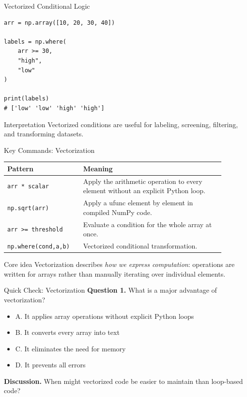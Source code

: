 \documentclass[aspectratio=169,11pt]{beamer}
\newcommand{\quiztitle}[1]{\textbf{\textcolor{QuizOrange}{#1}}}
\begin{document}
\begin{frame}[fragile]{Vectorized Conditional Logic}
\small
\begin{lstlisting}[style=py]
arr = np.array([10, 20, 30, 40])

labels = np.where(
    arr >= 30,
    "high",
    "low"
)

print(labels)
# ['low' 'low' 'high' 'high']
\end{lstlisting}
\begin{block}{Interpretation}
Vectorized conditions are useful for labeling, screening, filtering, and transforming datasets.
\end{block}
\end{frame}

\begin{frame}{Key Commands: Vectorization}
\small
\begin{tabular}{p{0.30\linewidth}p{0.59\linewidth}}
\toprule
\textbf{Pattern} & \textbf{Meaning} \\
\midrule
\texttt{arr * scalar} & Apply the arithmetic operation to every element without an explicit Python loop. \\
\texttt{np.sqrt(arr)} & Apply a ufunc element by element in compiled NumPy code. \\
\texttt{arr >= threshold} & Evaluate a condition for the whole array at once. \\
\texttt{np.where(cond,a,b)} & Vectorized conditional transformation. \\
\bottomrule
\end{tabular}
\begin{block}{Core idea}
Vectorization describes \emph{how we express computation}: operations are written for arrays rather than manually iterating over individual elements.
\end{block}
\end{frame}

\begin{frame}{Quick Check: Vectorization}
\small
\quiztitle{Question 1.} What is a major advantage of vectorization?
\begin{itemize}
  \item A. It applies array operations without explicit Python loops
  \item B. It converts every array into text
  \item C. It eliminates the need for memory
  \item D. It prevents all errors
\end{itemize}
\vspace{0.8em}
\quiztitle{Discussion.} When might vectorized code be easier to maintain than loop-based code?
\end{frame}
\end{document}

